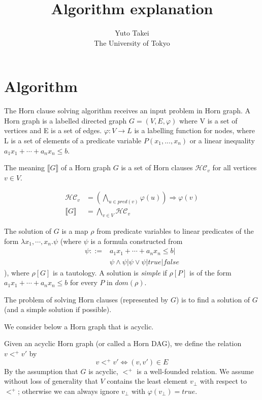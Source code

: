 \documentclass[a4paper,12pt]{article}
\title{Algorithm explanation}
\author{Yuto Takei \\ The University of Tokyo}
\begin{document}
\maketitle

\section{Algorithm}

The Horn clause solving algorithm receives an input problem in Horn
graph. A Horn graph is a labelled directed graph $G=(V,E,\varphi)$
where V is a set of vertices and E is a set of edges. $\varphi: V
\rightarrow L$ is a labelling function for nodes, where L is a set of
elements of a predicate variable $P(x_1, ..., x_n)$ or a linear
inequality $a_1 x_1 + \cdots + a_n x_n \leq b$.

The meaning $\llbracket G \rrbracket $ of a Horn graph $G$ is a set of
Horn clauses $\mathcal{HC}_v$ for all vertices $v \in V$.

\begin{align*}
\mathcal{HC}_v &= \left( \bigwedge_{u \in pred(v)} \varphi(u) \right)
\Longrightarrow \varphi(v) \\ \llbracket G \rrbracket &= \bigwedge_{v
  \in V} \mathcal{HC}_v
\end{align*}

The solution of $G$ is a map $\rho$ from predicate variables to linear
predicates of the form $\lambda x_1, \cdots ,x_n. \psi $ (where $\psi$
is a formula constructed from
\begin{align*}
\psi ::= &a_1 x_1 + \cdots + a_n x_n \leq b \vert \\ &\psi \wedge \psi
\vert \psi \vee \psi \vert true \vert false
\end{align*}
), where $\rho[G]$ is a tautology. A solution is \textit{simple} if
$\rho[P]$ is of the form $a_1 x_1 + \cdots + a_n x_n \leq b$ for every
$P$ in $dom(\rho)$.

The problem of solving Horn clauses (represented by $G$) is to find a
solution of $G$ (and a simple solution if possible).

We consider below a Horn graph that is acyclic.

Given an acyclic Horn graph (or called a Horn DAG), we define the
relation $v <^+ v'$ by
\[ v <^+ v' \Longleftrightarrow (v,v') \in E \]
By the assumption that $G$ is acyclic, $<^+$ is a well-founded
relation.  We assume without loss of generality that $V$ contains the
least element $v_\bot$ with respect to $<^+$; otherwise we can always
ignore $v_\bot$ with $\varphi(v_\bot) = true$.
\end{document}
